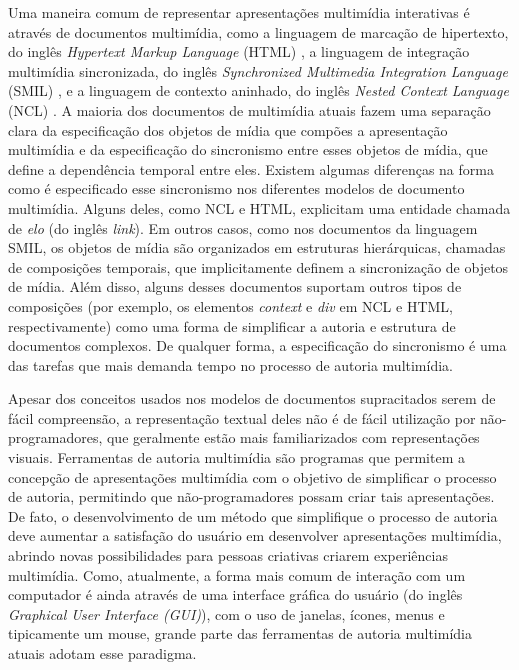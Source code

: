 \documentclass[../main.tex]{subfiles}
\begin{document}
Uma maneira comum de representar apresentações multimídia interativas é através de documentos multimídia, como a linguagem de marcação de hipertexto, do inglês \emph{Hypertext Markup Language} (HTML) \cite{graham1995html}, a 
linguagem de integração multimídia sincronizada, do inglês \emph{Synchronized Multimedia Integration Language} (SMIL) \cite{rutledge2001smil}, e a 
linguagem de contexto aninhado, do inglês \emph{Nested Context Language} (NCL) \cite{soares2009programando}. A maioria dos documentos de multimídia atuais fazem uma separação clara da especificação dos objetos de mídia que compões a apresentação multimídia e da especificação do sincronismo entre esses objetos de mídia, que define a dependência temporal entre eles. Existem algumas diferenças na forma como é especificado esse sincronismo nos diferentes modelos de documento multimídia. Alguns deles, como NCL e HTML, explicitam uma entidade chamada de \emph{elo} (do inglês \emph{link}). Em outros casos, como nos documentos da linguagem SMIL, os objetos de mídia são organizados em estruturas hierárquicas, chamadas de composições temporais, que implicitamente definem a sincronização de objetos de mídia. Além disso, alguns desses documentos suportam outros tipos de composições (por exemplo, os elementos \emph{context} e \emph{div} em NCL e HTML, respectivamente) como uma forma de simplificar a autoria e estrutura de documentos complexos. De qualquer forma, a especificação do sincronismo é uma das tarefas que mais demanda tempo no processo de autoria multimídia.

Apesar dos conceitos usados nos modelos de documentos supracitados serem de fácil compreensão, a representação textual deles não é de fácil utilização por não-programadores, que geralmente estão mais familiarizados com representações visuais. Ferramentas de autoria multimídia são programas que permitem a concepção de apresentações multimídia com o objetivo de simplificar o processo de autoria, permitindo que não-programadores possam criar tais apresentações. De fato, o desenvolvimento de um método que simplifique o processo de autoria deve aumentar a satisfação do usuário em desenvolver apresentações multimídia, abrindo novas possibilidades para pessoas criativas criarem experiências multimídia. Como, atualmente, a forma mais comum de interação com um computador é ainda através de uma interface gráfica do usuário (do inglês \emph{Graphical User Interface (GUI)}), com o uso de janelas, ícones, menus e tipicamente um mouse, grande parte das ferramentas de autoria multimídia atuais adotam esse paradigma.
\end{document}
